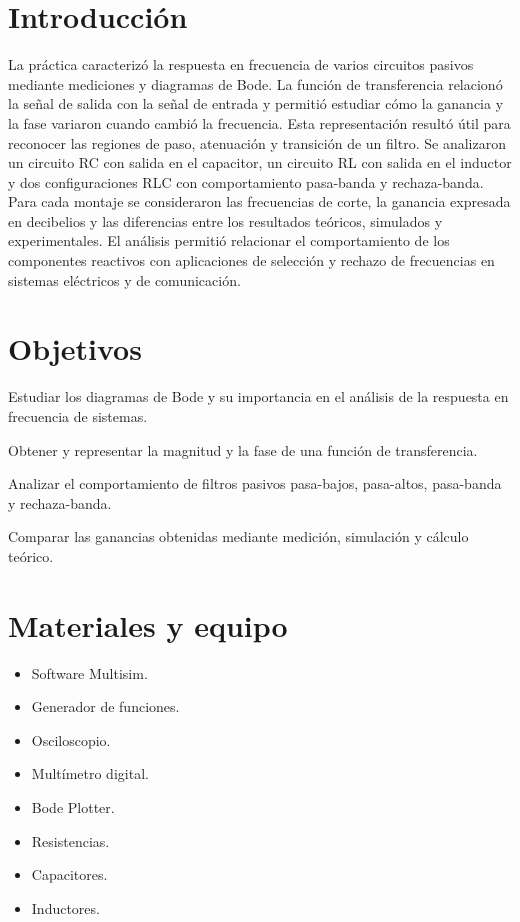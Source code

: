 \documentclass[12pt,a4paper]{article}
\begin{document}
\section{Introducción}
La práctica caracterizó la respuesta en frecuencia de varios circuitos pasivos mediante mediciones y diagramas de Bode. La función de transferencia relacionó la señal de salida con la señal de entrada y permitió estudiar cómo la ganancia y la fase variaron cuando cambió la frecuencia. Esta representación resultó útil para reconocer las regiones de paso, atenuación y transición de un filtro. Se analizaron un circuito RC con salida en el capacitor, un circuito RL con salida en el inductor y dos configuraciones RLC con comportamiento pasa-banda y rechaza-banda. Para cada montaje se consideraron las frecuencias de corte, la ganancia expresada en decibelios y las diferencias entre los resultados teóricos, simulados y experimentales. El análisis permitió relacionar el comportamiento de los componentes reactivos con aplicaciones de selección y rechazo de frecuencias en sistemas eléctricos y de comunicación.

\section{Objetivos}
\begin{itemsinforme}
    \item Estudiar los diagramas de Bode y su importancia en el análisis de la respuesta en frecuencia de sistemas.
    \item Obtener y representar la magnitud y la fase de una función de transferencia.
    \item Analizar el comportamiento de filtros pasivos pasa-bajos, pasa-altos, pasa-banda y rechaza-banda.
    \item Comparar las ganancias obtenidas mediante medición, simulación y cálculo teórico.
\end{itemsinforme}

\section{Materiales y equipo}
\begin{itemize}
    \item Software Multisim.
    \item Generador de funciones.
    \item Osciloscopio.
    \item Multímetro digital.
    \item Bode Plotter.
    \item Resistencias.
    \item Capacitores.
    \item Inductores.
\end{itemize}
\end{document}
